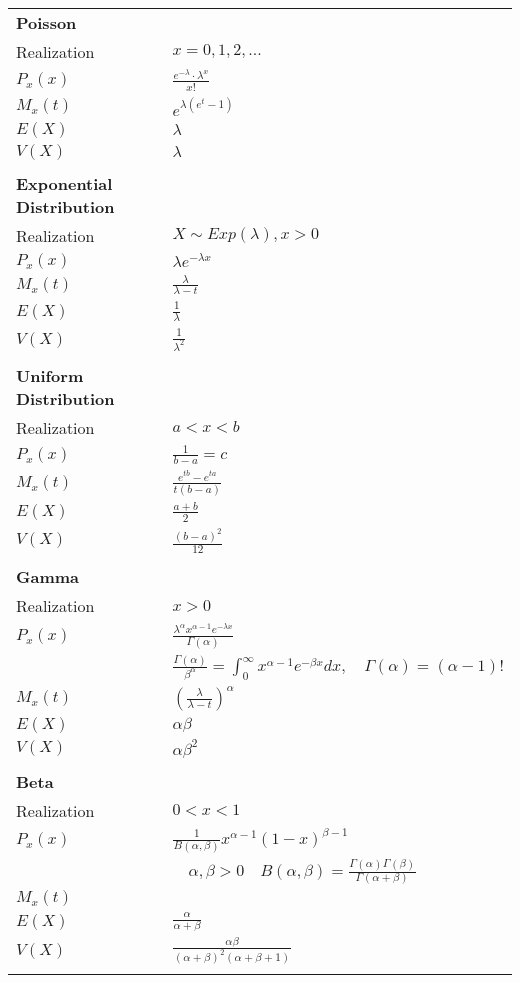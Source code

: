 \documentclass[12pt]{article}
\newcommand{\pp}[1]{\left(#1\right)}
\begin{document}
\newpage
\begin{tabularx}{\textwidth}{X | X}
	\textbf{Poisson} \\
	Realization & $x = 0, 1, 2, ...$ \\
	$P_x(x)$ & $\frac{e^{-\lambda} \cdot \lambda^x}{x!}$ \\
	$M_x(t)$ & $e^{\lambda (e^t - 1)}$ \\
	$E(X)$ & $\lambda$ \\
	$V(X)$ & $\lambda$ \\\\
	\textbf{Exponential Distribution} \\
	Realization & $X \sim Exp(\lambda), x > 0$ \\
	$P_x(x)$ & $\lambda e^{-\lambda x}$ \\
	$M_x(t)$ & $\frac{\lambda}{\lambda - t}$ \\
	$E(X)$ & $\frac{1}{\lambda}$ \\
	$V(X)$ & $\frac{1}{\lambda^2}$ \\\\
	\textbf{Uniform Distribution} \\
	Realization & $a < x < b$ \\
	$P_x(x)$ & $\frac{1}{b - a} = c$ \\
	$M_x(t)$ & $\frac{e^{tb} - e^{ta}}{t(b - a)}$ \\
	$E(X)$ & $\frac{a + b}{2}$ \\
	$V(X)$ & $\frac{(b - a)^2}{12}$ \\\\
	\textbf{Gamma} \\
	Realization & $x > 0$ \\
	$P_x(x)$ & $\frac{\lambda^\alpha x^{\alpha - 1} e^{-\lambda x}}{\Gamma(\alpha)}$ \\
	& $\frac{\Gamma(\alpha)}{\beta^\alpha} = \int_0^\infty x^{\alpha - 1} e^{-\beta x} dx, \quad \Gamma(\alpha) = (\alpha - 1)!$ \\
	$M_x(t)$ & $\pp{\frac{\lambda}{\lambda - t}}^\alpha$ \\
	$E(X)$ & $\alpha \beta$ \\
	$V(X)$ & $\alpha \beta^2$ \\\\
	\textbf{Beta} \\
	Realization & $0 < x < 1$ \\
	$P_x(x)$ & $\frac{1}{B(\alpha, \beta)} x^{\alpha - 1} (1 - x)^{\beta - 1}$ \\ 
	& $\quad \alpha, \beta > 0 \quad B(\alpha, \beta) = \frac{\Gamma(\alpha) \Gamma(\beta)}{\Gamma(\alpha + \beta)}$ \\
	$M_x(t)$ & $ $ \\
	$E(X)$ & $\frac{\alpha}{\alpha + \beta}$ \\
	$V(X)$ & $\frac{\alpha \beta}{(\alpha + \beta)^2 (\alpha + \beta + 1)}$ \\\\
\end{tabularx}
\end{document}
